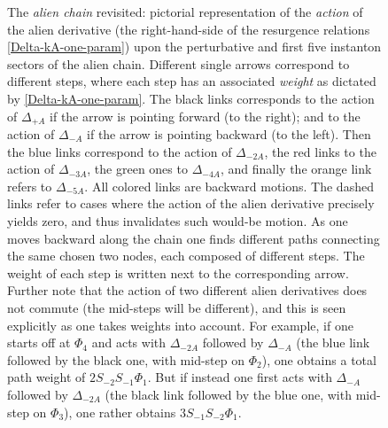 \documentclass[11pt,a4paper]{article}
\begin{document}
\begin{figure}[t!]
\vspace*{-65pt}
\caption{The \textit{alien chain} revisited: pictorial representation of the \textit{action} of the alien derivative (the right-hand-side of the resurgence relations \eqref{Delta-kA-one-param}) upon the perturbative and first five instanton sectors of the alien chain. Different single arrows correspond to different steps, where each step has an associated \textit{weight} as dictated by \eqref{Delta-kA-one-param}. The black links corresponds to the action of $\Delta_{+A}$ if the arrow is pointing forward (to the right); and to the action of $\Delta_{-A}$ if the arrow is pointing backward (to the left). Then the blue links correspond to the action of $\Delta_{-2A}$, the red links to the action of $\Delta_{-3A}$, the green ones to $\Delta_{-4A}$, and finally the orange link refers to $\Delta_{-5A}$. All colored links are backward motions. The dashed links refer to cases where the action of the alien derivative precisely yields zero, and thus invalidates such would-be motion. As one moves backward along the chain one finds different paths connecting the same chosen two nodes, each composed of different steps. The weight of each step is written next to the corresponding arrow. Further note that the action of two different alien derivatives does not commute (the mid-steps will be different), and this is seen explicitly as one takes weights into account. For example, if one starts off at $\Phi_4$ and acts with $\Delta_{-2A}$ followed by $\Delta_{-A}$ (the blue link followed by the black one, with mid-step on $\Phi_2$), one obtains a total path weight of $2 S_{-2} S_{-1} \Phi_1$. But if instead one first acts with $\Delta_{-A}$ followed by $\Delta_{-2A}$ (the black link followed by the blue one, with mid-step on $\Phi_3$), one rather obtains $3 S_{-1} S_{-2} \Phi_{1}$.}
\label{fig:first-5-sector-alien-1-param}
\end{figure}
\end{document}
